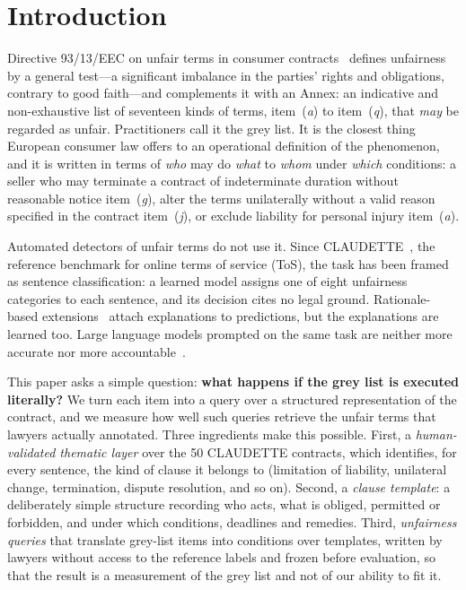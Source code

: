 \documentclass{IOS-Book-Article}
\newcommand{\corpus}{CLAUDETTE}
\newcommand{\gl}[1]{item~(\textit{#1})}
\begin{document}
\section{Introduction}
Directive 93/13/EEC on unfair terms in consumer contracts~\cite{eu1993directive} defines unfairness by a general test---a significant imbalance in the parties' rights and obligations, contrary to good faith---and complements it with an Annex: an indicative and non-exhaustive list of seventeen kinds of terms, \gl{a} to \gl{q}, that \emph{may} be regarded as unfair. Practitioners call it the grey list. It is the closest thing European consumer law offers to an operational definition of the phenomenon, and it is written in terms of \emph{who} may do \emph{what} to \emph{whom} under \emph{which} conditions: a seller who may terminate a contract of indeterminate duration without reasonable notice \gl{g}, alter the terms unilaterally without a valid reason specified in the contract \gl{j}, or exclude liability for personal injury \gl{a}.

Automated detectors of unfair terms do not use it. Since \corpus{}~\cite{lippi2019claudette}, the reference benchmark for online terms of service (ToS), the task has been framed as sentence classification: a learned model assigns one of eight unfairness categories to each sentence, and its decision cites no legal ground. Rationale-based extensions~\cite{ruggeri2022memory,liepina2020claudettetool} attach explanations to predictions, but the explanations are learned too. Large language models prompted on the same task are neither more accurate nor more accountable~\cite{panarelli2025worth,frasheri2024llm}.

This paper asks a simple question: \textbf{what happens if the grey list is executed literally?} We turn each item into a query over a structured representation of the contract, and we measure how well such queries retrieve the unfair terms that lawyers actually annotated. Three ingredients make this possible. First, a \emph{human-validated thematic layer} over the 50 \corpus{} contracts, which identifies, for every sentence, the kind of clause it belongs to (limitation of liability, unilateral change, termination, dispute resolution, and so on). Second, a \emph{clause template}: a deliberately simple structure recording who acts, what is obliged, permitted or forbidden, and under which conditions, deadlines and remedies. Third, \emph{unfairness queries} that translate grey-list items into conditions over templates, written by lawyers without access to the reference labels and frozen before evaluation, so that the result is a measurement of the grey list and not of our ability to fit it.
\end{document}
